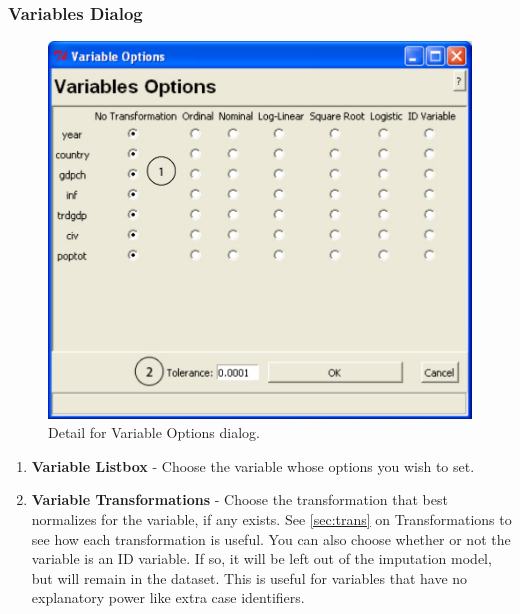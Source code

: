 \documentclass[12pt,titlepage]{article}
\begin{document}
\subsubsection{Variables Dialog}
\label{sec:vardiag}
\begin{figure}[ht]
  \centering
  \includegraphics[scale=.75]{varopts}
  \caption{Detail for Variable Options dialog.}
\end{figure}
\begin{enumerate}
\item \textbf{Variable Listbox} - Choose the variable whose options you wish to set.
\item \textbf{Variable Transformations} - Choose the transformation that best normalizes for the variable, if any exists.  See \ref{sec:trans} on Transformations to see how each transformation is useful.  You can also choose whether or not the variable is an ID variable.  If so, it will be left out of the imputation model, but will remain in the dataset.  This is useful for variables that have no explanatory power like extra case identifiers.  
\end{enumerate}
\end{document}
